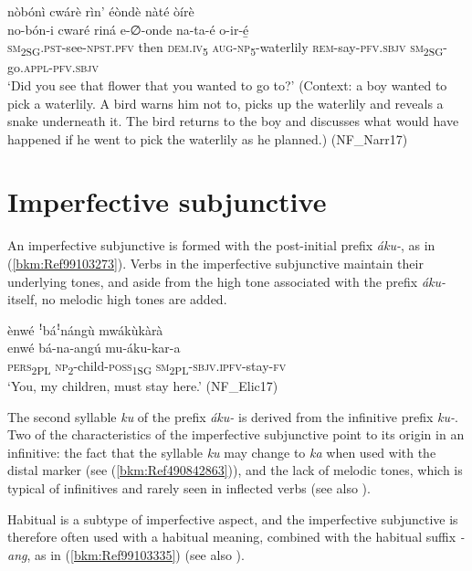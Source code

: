 \ea
\label{bkm:Ref99103238}
nòbónì cwárè rìn’ éòndè nàté òírè\\
\gll no-bón-i      cwaré  riná    e-∅-onde na-ta-é    o-ir-é̲ \\
\textsc{sm}\textsubscript{2SG}.\textsc{pst}-see-\textsc{npst}.\textsc{pfv}  then  \textsc{dem}.\textsc{iv}\textsubscript{5}  \textsc{aug}-\textsc{np}\textsubscript{5}-waterlily
\textsc{rem}-say-\textsc{pfv}.\textsc{sbjv}  \textsc{sm}\textsubscript{2SG}-go.\textsc{appl}-\textsc{pfv}.\textsc{sbjv}\\
\glt ‘Did you see that flower that you wanted to go to?’ (Context: a boy wanted to pick a waterlily. A bird warns him not to, picks up the waterlily and reveals a snake underneath it. The bird returns to the boy and discusses what would have happened if he went to pick the waterlily as he planned.) (NF\_Narr17)
\z
\section{Imperfective subjunctive}
\label{bkm:Ref489363941}\hypertarget{Toc75352702}{}\label{bkm:Ref489884199}
An imperfective subjunctive is formed with the post-initial prefix \textit{áku-}, as in (\ref{bkm:Ref99103273}). Verbs in the imperfective subjunctive maintain their underlying tones, and aside from the high tone associated with the prefix \textit{áku-} itself, no melodic high tones are added.

\ea
\label{bkm:Ref99103273}
ènwé ꜝbáꜝnángù mwákùkàrà\\
\gll enwé    bá-na-angú    mu-áku-kar-a\\
\textsc{pers}\textsubscript{2PL} \textsc{np}\textsubscript{2}-child-\textsc{poss}\textsubscript{1SG}  \textsc{sm}\textsubscript{2PL}-\textsc{sbjv}.\textsc{ipfv}-stay-\textsc{fv}\\
\glt ‘You, my children, must stay here.’ (NF\_Elic17)
\z

The second syllable \textit{ku} of the prefix \textit{áku-} is derived from the infinitive prefix \textit{ku-}. Two of the characteristics of the imperfective subjunctive point to its origin in an infinitive: the fact that the syllable \textit{ku} may change to \textit{ka} when used with the distal marker (see (\ref{bkm:Ref490842863})), and the lack of melodic tones, which is typical of infinitives and rarely seen in inflected verbs (see also ).

Habitual is a subtype of imperfective aspect, and the imperfective subjunctive is therefore often used with a habitual meaning, combined with the habitual suffix \textit{-ang}, as in (\ref{bkm:Ref99103335}) (see also ).

